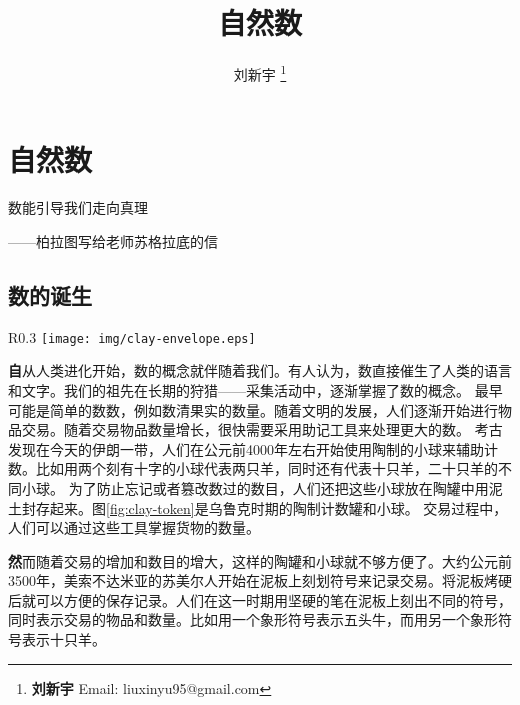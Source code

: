 \documentclass[UTF8]{article}
\begin{document}
\title{自然数}

\author{刘新宇
\thanks{{\bfseries 刘新宇} \newline
  Email: liuxinyu95@gmail.com \newline}
  }

\maketitle
\fi


\ifx\wholebook\relax
\chapter{自然数}
\fi

\epigraph{数能引导我们走向真理}{——柏拉图写给老师苏格拉底的信}

\section{数的诞生}

\begin{wrapfigure}{R}{0.3\textwidth}
 \centering
 \texttt{[image: img/clay-envelope.eps]}
 \caption{卢浮宫陈列的乌鲁尔时期的计数陶罐和一组计数陶球。}
 \label{fig:clay-token}
\end{wrapfigure}

\textbf{自}从人类进化开始，数的概念就伴随着我们。有人认为，数直接催生了人类的语言和文字。我们的祖先在长期的狩猎——采集活动中，逐渐掌握了数的概念。
最早可能是简单的数数，例如数清果实的数量。随着文明的发展，人们逐渐开始进行物品交易。随着交易物品数量增长，很快需要采用助记工具来处理更大的数。
考古发现在今天的伊朗一带，人们在公元前4000年左右开始使用陶制的小球来辅助计数。比如用两个刻有十字的小球代表两只羊，同时还有代表十只羊，二十只羊的不同小球。
为了防止忘记或者篡改数过的数目，人们还把这些小球放在陶罐中用泥土封存起来。图\ref{fig:clay-token}是乌鲁克时期的陶制计数罐和小球\cite{wiki-number}。
交易过程中，人们可以通过这些工具掌握货物的数量\cite{trip-to-number-kindom}。


\textbf{然}而随着交易的增加和数目的增大，这样的陶罐和小球就不够方便了。大约公元前3500年，美索不达米亚的苏美尔人开始在泥板上刻划符号来记录交易。将泥板烤硬后就可以方便的保存记录。人们在这一时期用坚硬的笔在泥板上刻出不同的符号，同时表示交易的物品和数量。比如用一个象形符号表示五头牛，而用另一个象形符号表示十只羊。
\end{document}
